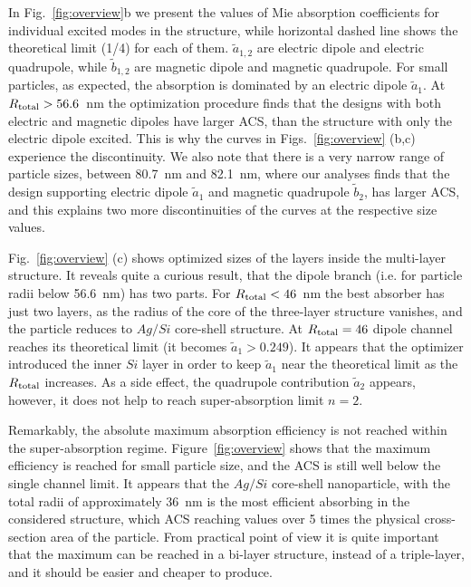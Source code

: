 \documentclass[aps,prl,twocolumn,showpacs,superscriptaddress,groupedaddress]{revtex4-1}
\begin{document}
In Fig.~\ref{fig:overview}b we present the values of Mie absorption
coefficients for individual excited modes in the structure, while
horizontal dashed line shows the theoretical limit (1/4) for each of
them. $\tilde{a}_{1,2}$ are electric dipole and electric quadrupole,
while $\tilde{b}_{1,2}$ are magnetic dipole and magnetic
quadrupole. For small particles, as expected, the absorption is
dominated by an electric dipole $\tilde{a}_1$.  At $R_{\rm total} >
56.6$~nm the optimization procedure finds that the designs with both
electric and magnetic dipoles have larger ACS, than the structure with
only the electric dipole excited. This is why the curves in
Figs.~\ref{fig:overview} (b,c) experience the discontinuity. We also
note that there is a very narrow range of particle sizes, between
80.7~nm and 82.1~nm, where our analyses finds that the design
supporting electric dipole $\tilde{a}_1$ and magnetic quadrupole
$\tilde{b}_2$, has larger ACS, and this explains two more
discontinuities of the curves at the respective size values.

Fig.~\ref{fig:overview} (c) shows optimized sizes of the layers inside
the multi-layer structure. It reveals quite a curious result, that the
dipole branch (i.e. for particle radii below 56.6~nm) has two
parts. For $R_{\rm total}<46$~nm the best absorber has just two
layers, as the radius of the core of the three-layer structure
vanishes, and the particle reduces to $Ag/Si$ core-shell structure.
At $R_{\rm total}=46$ dipole channel reaches its theoretical limit (it becomes
$\tilde{a}_1>0.249$).  It appears that the optimizer introduced the
inner $Si$ layer in order to keep $\tilde{a}_1$ near the theoretical
limit as the $R_{\rm total}$ increases.  As a side effect, the
quadrupole contribution $\tilde{a}_2$ appears, however, it does not
help to reach super-absorption limit $n=2$.

Remarkably, the absolute maximum absorption efficiency is not reached
within the super-absorption regime. Figure~\ref{fig:overview} shows
that the maximum efficiency is reached for small particle size, and
the ACS is still well below the single channel limit. It appears that
the $Ag/Si$ core-shell nanoparticle, with the total radii of
approximately 36~nm is the most efficient absorbing in the considered
structure, which ACS reaching values over 5 times the physical
cross-section area of the particle.  From practical point of view it
is quite important that the maximum can be reached in a bi-layer
structure, instead of a triple-layer, and it should be easier and
cheaper to produce.
\end{document}
